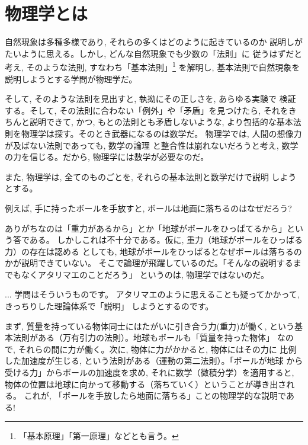 \chapter{物理学とは}

自然現象は多種多様であり, それらの多くはどのように起きているのか
説明しがたいように思える。しかし, どんな自然現象でも少数の「法則」に
従うはずだと考え, そのような法則, すなわち「基本法則」\footnote{「基本原理」「第一原理」などとも言う。}
を解明し, 基本法則で自然現象を説明しようとする学問が物理学だ。

そして, そのような法則を見出すと, 執拗にその正しさを, あらゆる実験で
検証する。そして, その法則に合わない「例外」や「矛盾」を見つけたら, 
それをきちんと説明できて, かつ, もとの法則とも矛盾しないような, 
より包括的な基本法則を物理学は探す。そのとき武器になるのは数学だ。
物理学では, 人間の想像力が及ばない法則であっても, 数学の論理
と整合性は崩れないだろうと考え, 数学の力を信じる。だから, 
物理学には数学が必要なのだ。\mv

また, 物理学は, 全てのものごとを, それらの基本法則と数学だけで説明
しようとする。

例えば, 手に持ったボールを手放すと, ボールは地面に落ちるのはなぜだろう?

ありがちなのは「重力があるから」とか「地球がボールをひっぱてるから」という答である。
しかしこれは不十分である。仮に, 重力（地球がボールをひっぱる力）の存在は認める
としても, 地球がボールをひっぱるとなぜボールは落ちるのかが説明できていない。
そこで論理が飛躍しているのだ。「そんなの説明するまでもなくアタリマエのことだろう」
というのは, 物理学ではないのだ。

\begin{faq}{\small{} ... 学問はそういうものです。
アタリマエのように思えることも疑ってかかって, きっちりした理論体系で「説明」
しようとするのです。}\end{faq}

まず, 質量を持っている物体同士にはたがいに引き合う力(重力)が働く, 
という基本法則がある（万有引力の法則）。地球もボールも「質量を持った物体」
なので, それらの間に力が働く。次に, 物体に力がかかると, 物体にはその力に
比例した加速度が生じる, という法則がある（運動の第二法則）。「ボールが地球
から受ける力」からボールの加速度を求め, それに数学（微積分学）を適用すると, 
物体の位置は地球に向かって移動する（落ちていく）ということが導き出される。
これが, 「ボールを手放したら地面に落ちる」ことの物理学的な説明である!\\

